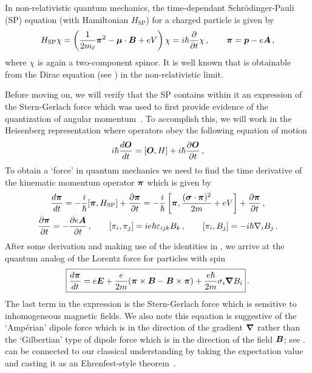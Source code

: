 In non-relativistic quantum mechanics, the time-dependant Schr{\"o}dinger-Pauli (SP) equation (with Hamiltonian $H_\mathrm{SP}$) for a charged particle is given by
\begin{gather}
	\label{sp:1}
    {H}_{\mathrm{SP}}\chi=\left(\frac{1}{2m_{\ell}}\boldsymbol{\pi}^{2}-\boldsymbol{\mu}\cdot\boldsymbol{B}+e{ V}\right)\chi=i\hbar\frac{\partial}{\partial t}\chi\,,\qquad
    \boldsymbol{\pi}=\boldsymbol{ p}-e{\boldsymbol{A}}\,,
\end{gather}
where $\chi$ is again a two-component spinor. It is well known that  is obtainable from the Dirac equation (see ) in the non-relativistic limit.

Before moving on, we will verify that the SP  contains within it an expression of the Stern-Gerlach force which was used to first provide evidence of the quantization of angular momentum~\citep{Gerlach:1922zz}. To accomplish this, we will work in the Heisenberg representation where operators obey the following equation of motion
\begin{align}
    \label{h:1}
    i\hbar\frac{d\boldsymbol{O}}{dt}=[\boldsymbol{O},H]+
    i\hbar\frac{\partial\boldsymbol{O}}{\partial t}\,,
\end{align}
To obtain a `force' in quantum mechanics we need to find the time derivative of the kinematic momentum operator $\boldsymbol{\pi}$ which is given by
\begin{gather}
    \label{h:2}
    \frac{d\boldsymbol{\pi}}{dt}=-\frac{i}{\hbar}[\boldsymbol{\pi},H_\mathrm{SP}]+\frac{\partial\boldsymbol{\pi}}{\partial t}=-\frac{i}{\hbar}\left[\boldsymbol{\pi},\frac{(\boldsymbol{\sigma}\cdot\boldsymbol{\pi})^{2}}{2m}+eV\right]+\frac{\partial\boldsymbol{\pi}}{\partial t}\,,\\
    \label{h:3}
    \frac{\partial\boldsymbol{\pi}}{\partial t} = -\frac{\partial e\boldsymbol{A}}{\partial t}\,,\qquad
    [\pi_{i},\pi_{j}]=ie\hbar\varepsilon_{ijk}B_{k}\,,\qquad
    [\pi_{i},B_{j}]=-i\hbar\nabla_{i}B_{j}\,.
\end{gather}
After some derivation and making use of the identities in , we arrive at the quantum analog of the Lorentz force for particles with spin
\begin{gather}
    \label{ehren:1}
    \boxed{\frac{d\boldsymbol{\pi}}{dt}=e\boldsymbol{E}+\frac{e}{2m}(\boldsymbol{\pi}\times\boldsymbol{B}-\boldsymbol{B}\times\boldsymbol{\pi})+\frac{e\hbar}{2m}\sigma_{i}\boldsymbol{\nabla}B_{i}}\,.
\end{gather}
The last term in the expression is the Stern-Gerlach force which is sensitive to inhomogeneous magnetic fields. We also note this equation is suggestive of the `Amp{\'e}rian' dipole force which is in the direction of the gradient $\boldsymbol{\nabla}$ rather than the `Gilbertian' type of dipole force which is in the direction of the field $\boldsymbol{B}$; see .  can be connected to our classical understanding by taking the expectation value and casting it as an Ehrenfest-style theorem~\citep{Ehrenfest:1927swx}.

